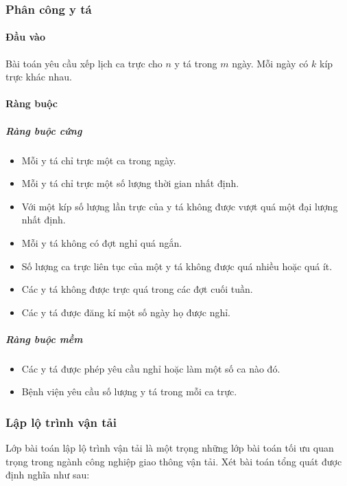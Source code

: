 \documentclass[a4paper,12pt]{report}
\begin{document}
\subsubsection{Phân công y tá}
\paragraph{Đầu vào}
Bài toán yêu cầu xếp lịch ca trực cho $n$ y tá trong $m$ ngày. Mỗi ngày có $k$ kíp trực khác nhau.  
\paragraph{Ràng buộc}
\subparagraph{Ràng buộc cứng}
\begin{itemize}
\item Mỗi y tá chỉ trực một ca trong ngày.
\item Mỗi y tá chỉ trực một số lượng thời gian nhất định.
\item Với một kíp số lượng lần trực của y tá không được vượt quá một đại lượng nhất định.
\item Mỗi y tá không có đợt nghỉ quá ngắn.
\item Số lượng ca trực liên tục của một y tá không được quá nhiều hoặc quá ít.
\item Các y tá không được trực quá trong các đợt cuối tuần.
\item Các y tá được đăng kí một số ngày họ được nghỉ.
\end{itemize}
\subparagraph{Ràng buộc mềm}
\begin{itemize}
\item Các y tá được phép yêu cầu nghỉ hoặc làm một số ca nào đó.
\item Bệnh viện yêu cầu số lượng y tá trong mỗi ca trực.
\end{itemize}

\subsubsection{Lập lộ trình vận tải}
Lớp bài toán lập lộ trình vận tải \cite{TUHTT} là một trọng những lớp bài toán tối ưu quan trọng trong ngành công nghiệp giao thông vận tải. Xét bài toán tổng quát được định nghĩa như sau:
\end{document}
